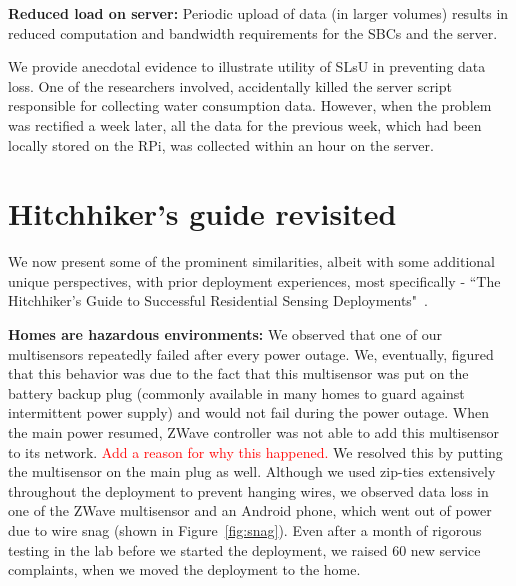 \documentclass[10pt]{sensys-proc}
\newcommand{\redcolor}[1]{\textcolor{red}{#1}}
\newcommand{\figref}[1]{Figure~\ref{#1}}
\newcommand{\selstups}{SLsU }
\begin{document}
\noindent \textbf{Reduced load on server:} Periodic upload of data (in larger volumes) results in reduced computation and bandwidth requirements for the SBCs and the server. 

We provide anecdotal evidence to illustrate utility of \selstups in preventing data loss. One of the researchers involved, accidentally killed the server script responsible for collecting water consumption data. However, when the problem was rectified a week later, all the data for the previous week, which had been locally stored on the RPi, was collected within an hour on the server. 


\vspace{-1mm}
\section{Hitchhiker's guide revisited}
\label{sec:common}
We now present some of the prominent similarities, albeit with some additional unique perspectives, with prior deployment experiences, most specifically - ``The Hitchhiker's Guide to Successful Residential Sensing Deployments"~\cite{hitchhiker_residential}. 

\noindent \textbf{Homes are hazardous environments:} We observed that one of our multisensors repeatedly failed after every power outage. %
We, eventually, figured that this behavior was due to the fact that this multisensor was put on the battery backup plug (commonly available in many homes to guard against intermittent power supply) and would not fail during the power outage. When the main power resumed, ZWave controller was not able to add this multisensor to its network. \redcolor{Add a reason for why this happened.} We resolved this by putting the multisensor on the main plug as well. %
Although we used zip-ties extensively throughout the deployment to prevent hanging wires, we observed data loss in one of the ZWave multisensor and an Android phone, which went out of power due to wire snag (shown in \figref{fig:snag}). Even after a month of rigorous testing in the lab before we started the deployment, we raised 60 new service complaints, when we moved the deployment to the home. %
\end{document}

